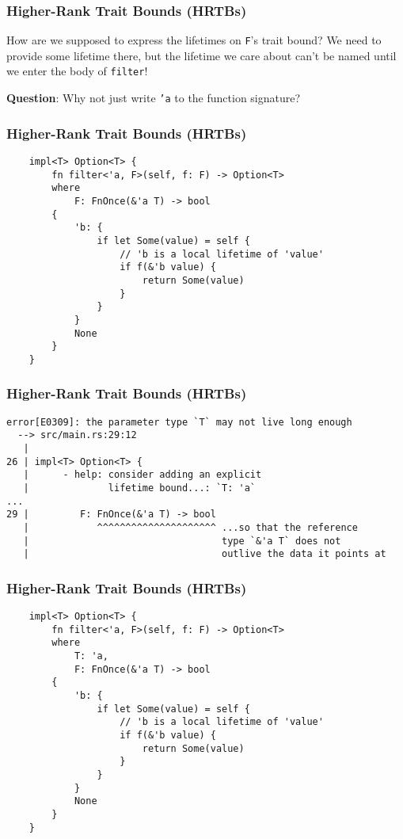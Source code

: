 \documentclass[aspectratio=1610,t]{beamer}
\begin{document}

\begin{frame}[fragile]
\frametitle{Higher-Rank Trait Bounds (HRTBs)}
How are we supposed to express the lifetimes on \texttt{F}'s trait bound? We need to provide some lifetime there, but the lifetime we care about can't be named until we enter the body of \texttt{filter}!

\textbf{Question}: Why not just write \texttt{'a} to the function signature?
\end{frame}


\begin{frame}[fragile]
\frametitle{Higher-Rank Trait Bounds (HRTBs)}
\begin{verbatim}
    impl<T> Option<T> {
        fn filter<'a, F>(self, f: F) -> Option<T>
        where
            F: FnOnce(&'a T) -> bool
        {
            'b: {
                if let Some(value) = self {
                    // 'b is a local lifetime of 'value'
                    if f(&'b value) {
                        return Some(value)
                    }
                }
            }
            None
        }
    }
\end{verbatim}
\end{frame}


\begin{frame}[fragile]
\frametitle{Higher-Rank Trait Bounds (HRTBs)}
\begin{verbatim}
error[E0309]: the parameter type `T` may not live long enough
  --> src/main.rs:29:12
   |
26 | impl<T> Option<T> {
   |      - help: consider adding an explicit
   |              lifetime bound...: `T: 'a`
...
29 |         F: FnOnce(&'a T) -> bool
   |            ^^^^^^^^^^^^^^^^^^^^^ ...so that the reference
   |                                  type `&'a T` does not
   |                                  outlive the data it points at
\end{verbatim}
\end{frame}


\begin{frame}[fragile,c]
\frametitle{Higher-Rank Trait Bounds (HRTBs)}
\begin{verbatim}
    impl<T> Option<T> {
        fn filter<'a, F>(self, f: F) -> Option<T>
        where
            T: 'a,
            F: FnOnce(&'a T) -> bool
        {
            'b: {
                if let Some(value) = self {
                    // 'b is a local lifetime of 'value'
                    if f(&'b value) {
                        return Some(value)
                    }
                }
            }
            None
        }
    }
\end{verbatim}
\end{frame}
\end{document}
